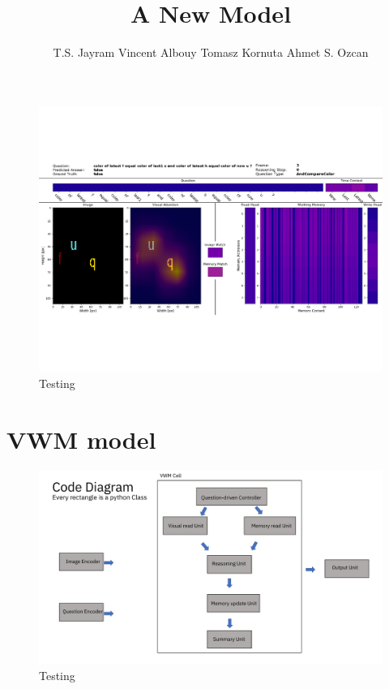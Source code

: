 \documentclass{article}
\title{A New Model}
\author{
	T.S. Jayram \And Vincent Albouy  \And Tomasz Kornuta \And Ahmet S. Ozcan}
\begin{document}
\maketitle

\blindtext

\begin{figure}[ht]
	\centering
	\includegraphics[width=\textwidth]{img/visualization}
	\caption{Testing}
	\label{fig:visualization}
\end{figure}

\blindmathtrue

\blindtext

\blindmathfalse

\section{VWM model}

\begin{figure}[ht]
	\centering
	\includegraphics[width=\textwidth]{img/model}
	\caption{Testing}
	\label{fig:model}
\end{figure}



\newpage

\end{document}
